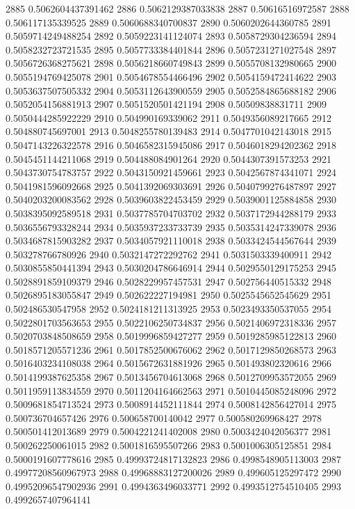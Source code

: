 2885 0.5062604437391462
2886 0.5062129387033838
2887 0.50616516972587
2888 0.506117135339525
2889 0.5060688340700837
2890 0.5060202644360785
2891 0.5059714249488254
2892 0.5059223141124074
2893 0.5058729304236594
2894 0.5058232723721535
2895 0.5057733384401844
2896 0.5057231271027548
2897 0.5056726368275621
2898 0.5056218660749843
2899 0.5055708132980665
2900 0.5055194769425078
2901 0.5054678554466496
2902 0.5054159472414622
2903 0.5053637507505332
2904 0.5053112643900559
2905 0.5052584865688182
2906 0.5052054156881913
2907 0.5051520501421194
2908 0.50509838831711
2909 0.5050444285922229
2910 0.504990169339062
2911 0.5049356089217665
2912 0.504880745697001
2913 0.5048255780139483
2914 0.5047701042143018
2915 0.5047143226322578
2916 0.5046582315945086
2917 0.5046018294202362
2918 0.5045451144211068
2919 0.504488084901264
2920 0.5044307391573253
2921 0.5043730754783757
2922 0.5043150921459661
2923 0.5042567874341071
2924 0.5041981596092668
2925 0.5041392069303691
2926 0.5040799276487897
2927 0.5040203200083562
2928 0.5039603822453459
2929 0.5039001125884858
2930 0.5038395092589518
2931 0.5037785704703702
2932 0.5037172944288179
2933 0.5036556793328244
2934 0.5035937233733739
2935 0.5035314247339078
2936 0.5034687815903282
2937 0.5034057921110018
2938 0.5033424544567644
2939 0.503278766780926
2940 0.5032147272292762
2941 0.5031503339400911
2942 0.5030855850441394
2943 0.5030204786646914
2944 0.5029550129175253
2945 0.5028891859109379
2946 0.5028229957457531
2947 0.502756440515332
2948 0.5026895183055847
2949 0.502622227194981
2950 0.5025545652545629
2951 0.502486530547958
2952 0.5024181211313925
2953 0.5023493350537055
2954 0.5022801703563653
2955 0.5022106250734837
2956 0.5021406972318336
2957 0.5020703848508659
2958 0.5019996859427277
2959 0.5019285985122813
2960 0.5018571205571236
2961 0.5017852500676062
2962 0.5017129850268573
2963 0.5016403234108038
2964 0.5015672631881926
2965 0.501493802320616
2966 0.5014199387625358
2967 0.5013456704613068
2968 0.5012709953572055
2969 0.5011959113834559
2970 0.5011204164662563
2971 0.5010445085248096
2972 0.5009681854713524
2973 0.5008914452111844
2974 0.5008142856427014
2975 0.500736704657426
2976 0.500658700140042
2977 0.500580269968427
2978 0.500501412013689
2979 0.5004221241402008
2980 0.5003424042056377
2981 0.500262250061015
2982 0.5001816595507266
2983 0.5001006305125851
2984 0.5000191607778616
2985 0.49993724817132823
2986 0.4998548905113003
2987 0.49977208560967973
2988 0.49968883127200026
2989 0.499605125297472
2990 0.49952096547902936
2991 0.4994363496033771
2992 0.4993512754510405
2993 0.4992657407964141
